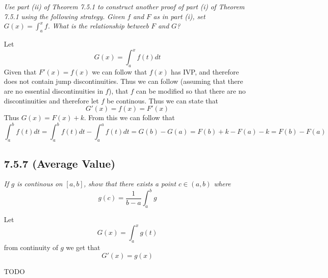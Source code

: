 \documentclass[11pt,oneside,titlepage]{book}
\begin{document}
\textit{Use part (ii) of Theorem 7.5.1 to construct another proof of part (i)
  of Theorem 7.5.1 using the following strategy. Given $f$ and $F$ as in part
  (i), set $G(x) = \int_a^x{f}$. What is the relationship betweeb $F$ and $G$?}

Let 
$$G(x) = \int_a^x{f(t)dt}$$
Given that $F'(x) = f(x)$ we can follow that $f(x)$ has IVP, and therefore
does not contain jump discontinuities. Thus we can follow (assuming that there
are no essential discontinuities in $f$), that
$f$ can be modified so that there are no discontinuities and therefore
let $f$ be continous. Thus we can state that
$$G'(x) = f(x) = F'(x)$$
Thus $G(x) = F(x) + k$. From this we can follow that
$$\int_a^b{f(t)dt} = \int_a^b{f(t)dt} - \int_a^a{f(t)dt} =
G(b) - G(a) = F(b) + k - F(a) - k = F(b) - F(a)$$

\subsection*{7.5.7 (Average Value)}

\textit{If $g$ is continous on $[a, b]$, show that there exists a point
  $c \in (a, b)$ where}
$$g(c) = \frac{1}{b - a}\int_a^b{g}$$

Let
$$G(x) = \int_a^x{g(t)}$$
from continuity of $g$ we get that
$$G'(x) = g(x)$$

TODO
\end{document}
